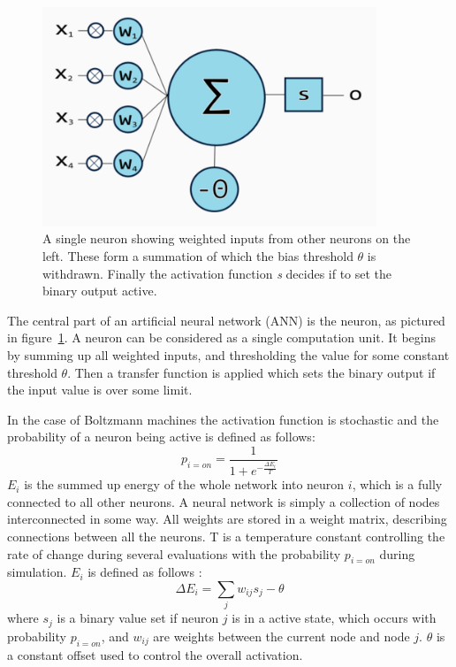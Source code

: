 \documentclass[a4paper,11pt]{kth-mag}
\begin{document}
\begin{figure}[here] 
\centering
\includegraphics[width=10cm]{images/neuron.png}
\caption[A single neuron]{A single neuron showing weighted inputs from other neurons on the left. These form a summation of which the bias threshold $\theta$ is withdrawn. Finally the activation function \emph{s} decides if to set the binary output active.}
\label{fig:neural-Neuron}
\end{figure}
The central part of an artificial neural network (ANN) is the neuron, as pictured in figure~\ref{fig:neural-Neuron}.
A neuron can be considered as a single computation unit.
It begins by summing up all weighted inputs, and thresholding the value for some constant threshold $\theta$.
Then a transfer function is applied which sets the binary output if the input value is over some limit.

In the case of Boltzmann machines the activation function is stochastic and the probability of a neuron being active is defined as follows:
\[
p_{i=on} = \frac{1}{1+e^{-\frac{\Delta E_{i}}{T}}}
\]
$E_i$ is the summed up energy of the whole network into neuron $i$, which is a fully connected to all other neurons.
A neural network is simply a collection of nodes interconnected in some way.
All weights are stored in a weight matrix, describing connections between all the neurons.
T is a temperature constant controlling the rate of change during several evaluations with the probability $p_{i=on}$ during simulation.
$E_i$ is defined as follows \cite{boltzmann2}:
\[
\Delta E_{i} = \sum_{j} w_{ij} s_{j} - \theta
\]
where $s_j$ is a binary value set if neuron $j$ is in a active state, which occurs with probability $p_{i=on}$, and $w_{ij}$ are weights between the current node and node $j$. $\theta$ is a constant offset used to control the overall activation.
\end{document}
